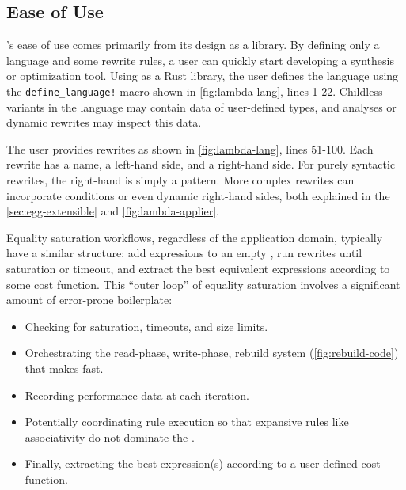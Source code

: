 \subsection{Ease of Use}
\label{sec:egg-easy}



\egg's ease of use comes primarily from its design as a library.
By defining only a language and some rewrite rules,
  a user can quickly
  start developing a synthesis or optimization tool.
Using \egg as a Rust library,
  the user defines the language using the \texttt{define\_language!} macro
  shown in \autoref{fig:lambda-lang}, lines 1-22.
Childless variants in the language may contain data of user-defined types,
  and \eclass analyses or dynamic rewrites may inspect this data.


The user provides rewrites as shown in
  \autoref{fig:lambda-lang}, lines 51-100.
Each rewrite has a name, a left-hand side, and a right-hand side.
For purely syntactic rewrites, the right-hand is simply a pattern.
More complex rewrites can incorporate conditions or even dynamic right-hand
  sides, both explained in the \autoref{sec:egg-extensible} and \autoref{fig:lambda-applier}.

Equality saturation workflows, regardless of the application domain,
  typically have a similar structure:
add expressions to an empty \egraph, run rewrites until saturation or
  timeout, and extract the best equivalent expressions according to some cost
  function.
This ``outer loop'' of equality saturation involves a significant amount of
  error-prone boilerplate:
\begin{itemize}
  \item Checking for saturation, timeouts, and \egraph size limits.
  \item Orchestrating the read-phase, write-phase, rebuild system
    (\autoref{fig:rebuild-code}) that makes \egg fast.
  \item Recording performance data at each iteration.
  \item Potentially coordinating rule execution so that expansive rules like
    associativity do not dominate the \egraph.
  \item Finally, extracting the best expression(s) according to a
  user-defined cost function.
\end{itemize}


